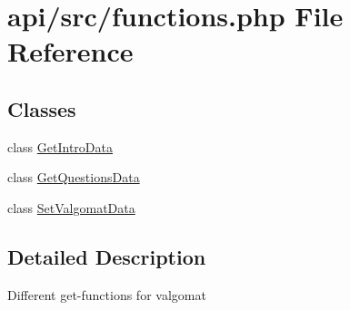 \hypertarget{functions_8php}{}\section{api/src/functions.php File Reference}
\label{functions_8php}
\subsection*{Classes}
\begin{DoxyCompactItemize}
\item 
class \hyperlink{class_get_intro_data}{Get\+Intro\+Data}
\item 
class \hyperlink{class_get_questions_data}{Get\+Questions\+Data}
\item 
class \hyperlink{class_set_valgomat_data}{Set\+Valgomat\+Data}
\end{DoxyCompactItemize}


\subsection{Detailed Description}
Different get-\/functions for valgomat 
